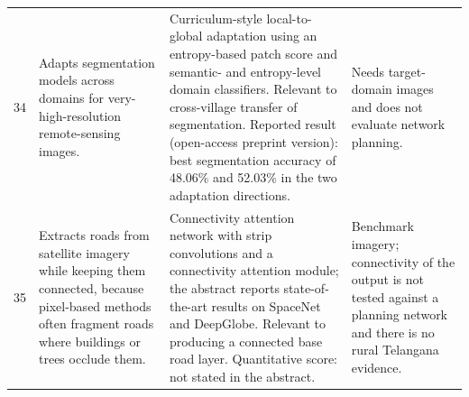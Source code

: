 \begin{landscape}
\begin{longtable}{@{}L{0.6cm}L{7.5cm}L{8.0cm}L{7.5cm}@{}}
34 & Adapts segmentation models across domains for very-high-resolution remote-sensing images. & Curriculum-style local-to-global adaptation using an entropy-based patch score and semantic- and entropy-level domain classifiers. Relevant to cross-village transfer of segmentation. Reported result (open-access preprint version): best segmentation accuracy of 48.06\% and 52.03\% in the two adaptation directions. & Needs target-domain images and does not evaluate network planning.  \\
35 & Extracts roads from satellite imagery while keeping them connected, because pixel-based methods often fragment roads where buildings or trees occlude them. & Connectivity attention network with strip convolutions and a connectivity attention module; the abstract reports state-of-the-art results on SpaceNet and DeepGlobe. Relevant to producing a connected base road layer. Quantitative score: not stated in the abstract. & Benchmark imagery; connectivity of the output is not tested against a planning network and there is no rural Telangana evidence.  \\
\end{longtable}
\end{landscape}

